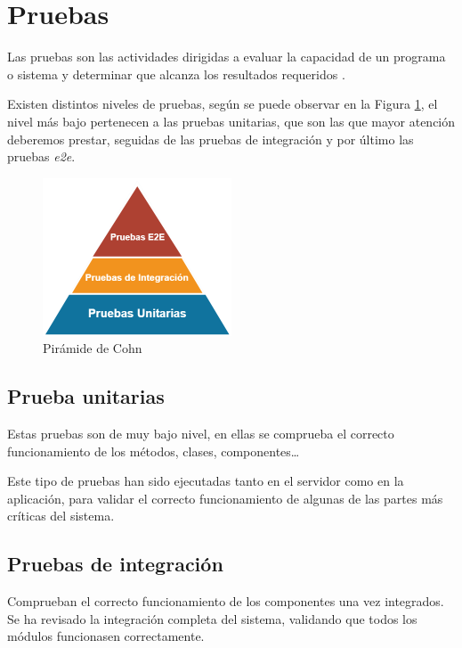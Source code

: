 \section{Pruebas}
\label{cap:pruebas}

Las pruebas son las actividades dirigidas a evaluar la capacidad de un programa o sistema y determinar que alcanza los resultados requeridos \cite{hetzel1988complete}.

Existen distintos niveles de pruebas, según se puede observar en la Figura \ref{fig:cohn}, el nivel más bajo pertenecen a las pruebas unitarias, que son las que mayor atención deberemos prestar, seguidas de las pruebas de integración y por último las pruebas \textit{e2e}. 

\begin{figure}[H]
    \centering
    \includegraphics[width=0.5\textwidth]{imaxes/piramide_cohn.png}
    \caption[Pirámide de Cohn]{Pirámide de Cohn \cite{cohn2010succeeding}}
    \label{fig:cohn}
\end{figure}

\subsection{Prueba unitarias}

Estas pruebas son de muy bajo nivel, en ellas se comprueba el correcto funcionamiento de los métodos, clases, componentes\dots

Este tipo de pruebas han sido ejecutadas tanto en el servidor como en la aplicación, para validar el correcto funcionamiento de algunas de las partes más críticas del sistema.

\subsection{Pruebas de integración}

Comprueban el correcto funcionamiento de los componentes una vez integrados. Se ha revisado la integración completa del sistema, validando que todos los módulos funcionasen correctamente.

